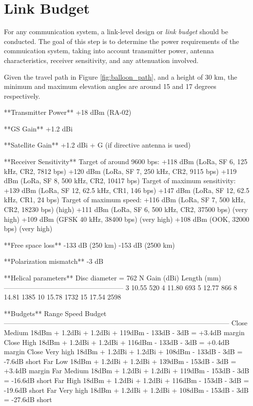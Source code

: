 \section{Link Budget}

For any communication system, a link-level design or \textit{link budget} should be conducted. The goal of this step is to determine the power requirements of the commuication system, taking into account transmitter power, antenna characteristics, receiver sensitivity, and any attenuation involved.

Given the travel path in Figure \ref{fig:balloon_path}, and a height of 30 km, the minimum and maximum elevation angles are around 15 and 17 degrees respectively.

**Transmitter Power**
+18 dBm (RA-02)

**GS Gain**
+1.2 dBi

**Satellite Gain**
+1.2 dBi + G (if directive antenna is used)

**Receiver Sensitivity**
Target of around 9600 bps:
    +118 dBm (LoRa, SF 6, 125 kHz, CR2, 7812 bps)
    +120 dBm (LoRa, SF 7, 250 kHz, CR2, 9115 bps)
    +119 dBm (LoRa, SF 8, 500 kHz, CR2, 10417 bps)
Target of maximum sensitivity:
    +139 dBm (LoRa, SF 12, 62.5 kHz, CR1, 146 bps)
    +147 dBm (LoRa, SF 12, 62.5 kHz, CR1, 24 bps)
Target of maximum speed:
    +116 dBm (LoRa, SF 7, 500 kHz, CR2, 18230 bps) (high)
    +111 dBm (LoRa, SF 6, 500 kHz, CR2, 37500 bps) (very high)
    +109 dBm (GFSK 40 kHz, 38400 bps) (very high)
    +108 dBm (OOK, 32000 bps) (very high)

**Free space loss**
-133 dB (250 km)
-153 dB (2500 km)

**Polarization mismatch**
-3 dB

**Helical parameters**
Disc diameter = 762
N               Gain (dBi)          Length (mm)
-----------------------------------------------------
3               10.55               520
4               11.80               693
5               12.77               866
8               14.81               1385
10              15.78               1732
15              17.54               2598

**Budgets**
Range           Speed               Budget
---------------------------------------------------------------------------------------------------
Close           Medium              18dBm + 1.2dBi + 1.2dBi + 119dBm - 133dB - 3dB = +3.4dB margin
Close           High                18dBm + 1.2dBi + 1.2dBi + 116dBm - 133dB - 3dB = +0.4dB margin
Close           Very high           18dBm + 1.2dBi + 1.2dBi + 108dBm - 133dB - 3dB = -7.6dB short
Far             Low                 18dBm + 1.2dBi + 1.2dBi + 139dBm - 153dB - 3dB = +3.4dB margin
Far             Medium              18dBm + 1.2dBi + 1.2dBi + 119dBm - 153dB - 3dB = -16.6dB short
Far             High                18dBm + 1.2dBi + 1.2dBi + 116dBm - 153dB - 3dB = -19.6dB short
Far             Very high           18dBm + 1.2dBi + 1.2dBi + 108dBm - 153dB - 3dB = -27.6dB short


